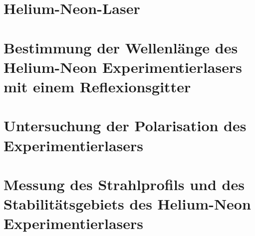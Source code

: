 \chapter{Helium-Neon-Laser}

\chapter{Bestimmung der Wellenlänge des Helium-Neon Experimentierlasers mit einem Reflexionsgitter}


\chapter{Untersuchung der Polarisation des Experimentierlasers}


\chapter{Messung des Strahlprofils und des Stabilitätsgebiets des
Helium-Neon Experimentierlasers}

